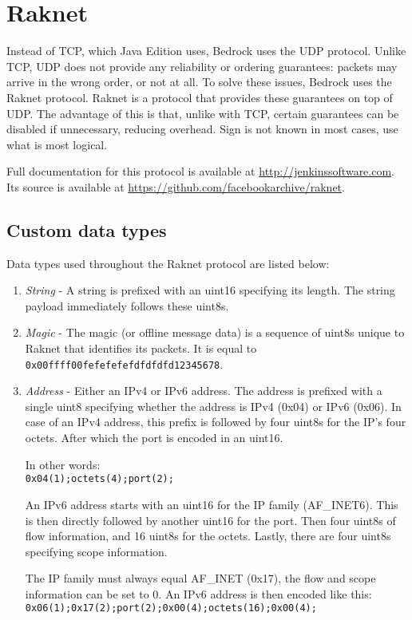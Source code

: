 \chapter{Raknet}\label{chap:raknet}

Instead of TCP, which Java Edition uses, Bedrock uses the UDP protocol.
Unlike TCP, UDP does not provide any reliability or ordering guarantees:
packets may arrive in the wrong order, or not at all. 
To solve these issues, Bedrock uses the Raknet protocol. 
Raknet is a protocol that provides these guarantees on top of UDP.
The advantage of this is that, unlike with TCP, certain guarantees can be disabled if unnecessary,
reducing overhead. Sign is not known in most cases, use what is most logical.

Full documentation for this protocol is available at \url{http://jenkinssoftware.com}.
Its source is available at \url{https://github.com/facebookarchive/raknet}.

\section{Custom data types}\label{sec:raknet-types}

Data types used throughout the Raknet protocol are listed below:
\begin{enumerate}
    \item \textit{String} - A string is prefixed with an uint16 specifying its length.
    The string payload immediately follows these uint8s.

    \item \textit{Magic} - The magic (or offline message data) is a sequence of uint8s unique to Raknet that identifies its packets.
    It is equal to \\
    \texttt{0x00ffff00fefefefefdfdfdfd12345678}.

    \item \textit{Address} - Either an IPv4 or IPv6 address.
        The address is prefixed with a single uint8 specifying whether the address is IPv4 (0x04) or IPv6 (0x06).
        In case of an IPv4 address, this prefix is followed by four uint8s for the IP's four octets.
        After which the port is encoded in an uint16. 

        In other words: \\
        \texttt{0x04(1);octets(4);port(2);}

        An IPv6 address starts with an uint16 for the IP family (AF\_INET6). 
        This is then directly followed by another uint16 for the port. 
        Then four uint8s of flow information, and 16 uint8s for the octets.
        Lastly, there are four uint8s specifying scope information.

        The IP family must always equal AF\_INET (0x17), the flow and scope information can be set to 0.
        An IPv6 address is then encoded like this:\\
        \texttt{0x06(1);0x17(2);port(2);0x00(4);octets(16);0x00(4);}
\end{enumerate}

